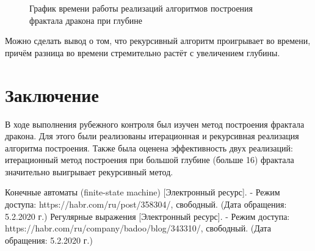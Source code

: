 \documentclass[12pt, a4paper]{report}
\begin{document}
	\begin{figure}[ht!]
		\caption{График времени работы реализаций алгоритмов построения фрактала дракона при глубине}
	\end{figure}

	Можно сделать вывод о том, что рекурсивный алгоритм проигрывает во времени, причём разница во времени стремительно растёт с увеличением глубины.

	\chapter*{Заключение}
	В ходе выполнения рубежного контроля был изучен метод построения фрактала дракона. Для этого были реализованы итерационная и рекурсивная реализация алгоритма построения. Также была оценена эффективность двух реализаций: итерационный метод построения при большой глубине (больше 16) фрактала значительно выигрывает рекурсивный метод.
	
	\newpage
	
	\begin{thebibliography}{}
	 Конечные автоматы (finite-state machine) [Электронный ресурс]. - Режим доступа:
	https://habr.com/ru/post/358304/, свободный. (Дата обращения: 5.2.2020 г.)
	 Регулярные выражения [Электронный ресурс]. - Режим доступа:
	https://habr.com/ru/company/badoo/blog/343310/, свободный. (Дата обращения:
	5.2.2020 г.)
	\end{thebibliography}
\end{document}
